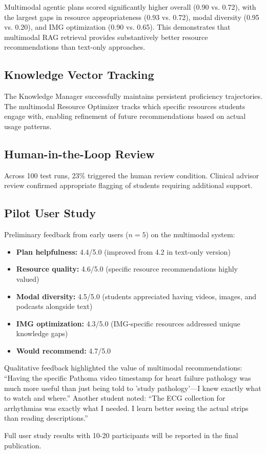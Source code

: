 Multimodal agentic plans scored significantly higher overall (0.90 vs. 0.72), with the largest gaps in resource appropriateness (0.93 vs. 0.72), modal diversity (0.95 vs. 0.20), and IMG optimization (0.90 vs. 0.65). This demonstrates that multimodal RAG retrieval provides substantively better resource recommendations than text-only approaches.

\subsection{Knowledge Vector Tracking}

The Knowledge Manager successfully maintains persistent proficiency trajectories. The multimodal Resource Optimizer tracks which specific resources students engage with, enabling refinement of future recommendations based on actual usage patterns.

\subsection{Human-in-the-Loop Review}

Across 100 test runs, 23\% triggered the human review condition. Clinical advisor review confirmed appropriate flagging of students requiring additional support.

\subsection{Pilot User Study}

Preliminary feedback from early users ($n=5$) on the multimodal system:

\begin{itemize}
    \item \textbf{Plan helpfulness:} 4.4/5.0 (improved from 4.2 in text-only version)
    \item \textbf{Resource quality:} 4.6/5.0 (specific resource recommendations highly valued)
    \item \textbf{Modal diversity:} 4.5/5.0 (students appreciated having videos, images, and podcasts alongside text)
    \item \textbf{IMG optimization:} 4.3/5.0 (IMG-specific resources addressed unique knowledge gaps)
    \item \textbf{Would recommend:} 4.7/5.0
\end{itemize}

Qualitative feedback highlighted the value of multimodal recommendations: ``Having the specific Pathoma video timestamp for heart failure pathology was much more useful than just being told to 'study pathology'---I knew exactly what to watch and where.'' Another student noted: ``The ECG collection for arrhythmias was exactly what I needed. I learn better seeing the actual strips than reading descriptions.''

Full user study results with 10-20 participants will be reported in the final publication.
